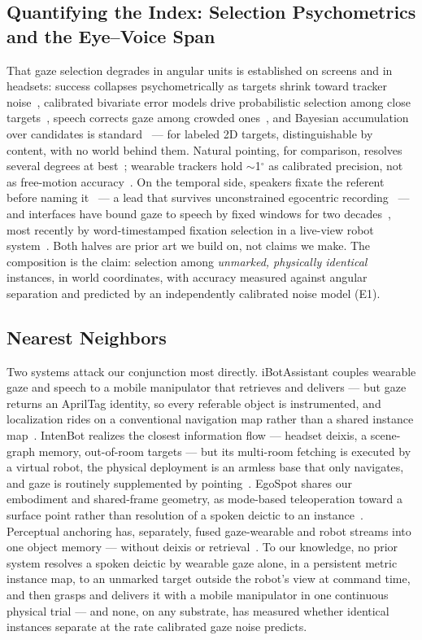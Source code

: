 \documentclass[letterpaper, 10 pt, conference]{ieeeconf}  %
\begin{document}
\subsection{Quantifying the Index: Selection Psychometrics and the Eye--Voice Span}
That gaze selection degrades in angular units is established on
screens and in headsets: success collapses psychometrically as
targets shrink toward tracker noise~\cite{schuetz2020}, calibrated
bivariate error models drive probabilistic selection among close
targets~\cite{evain2016,wei2023}, speech corrects gaze among crowded
ones~\cite{miniotas2006}, and Bayesian accumulation over candidates
is standard~\cite{bayesgaze2021} --- for labeled 2D targets,
distinguishable by content, with no world behind them. Natural
pointing, for comparison, resolves several degrees at
best~\cite{breuer2010}; wearable trackers hold $\sim$1$^\circ$ as
calibrated precision, not as free-motion
accuracy~\cite{onkhar2024}. On the temporal side, speakers fixate
the referent before naming it~\cite{eyevoicespan,meyer1998} --- a
lead that survives unconstrained egocentric
recording~\cite{lookandtell2025} --- and interfaces have bound gaze
to speech by fixed windows for two
decades~\cite{kaur2003,prasov2010,khan2026}, most recently by
word-timestamped fixation selection in a live-view robot
system~\cite{famhri}. Both halves are prior art we build on, not
claims we make. The composition is the claim: selection among
\emph{unmarked, physically identical} instances, in world
coordinates, with accuracy measured against angular separation and
predicted by an independently calibrated noise model (E1).

\subsection{Nearest Neighbors}
Two systems attack our conjunction most directly. iBotAssistant
couples wearable gaze and speech to a mobile manipulator that
retrieves and delivers --- but gaze returns an AprilTag identity, so
every referable object is instrumented, and localization rides on a
conventional navigation map rather than a shared instance
map~\cite{ibotassistant}. IntenBot realizes the closest information
flow --- headset deixis, a scene-graph memory, out-of-room targets
--- but its multi-room fetching is executed by a virtual robot, the
physical deployment is an armless base that only navigates, and gaze
is routinely supplemented by pointing~\cite{intenbot}. EgoSpot shares
our embodiment and shared-frame geometry, as mode-based teleoperation
toward a surface point rather than resolution of a spoken deictic to
an instance~\cite{egospot}. Perceptual anchoring has, separately,
fused gaze-wearable and robot streams into one object memory ---
without deixis or retrieval~\cite{sorensen2024}. To our knowledge, no
prior system resolves a spoken deictic by wearable gaze alone, in a
persistent metric instance map, to an unmarked target outside the
robot's view at command time, and then grasps and delivers it with a
mobile manipulator in one continuous physical trial --- and none, on
any substrate, has measured whether identical instances separate at
the rate calibrated gaze noise predicts.
\end{document}
